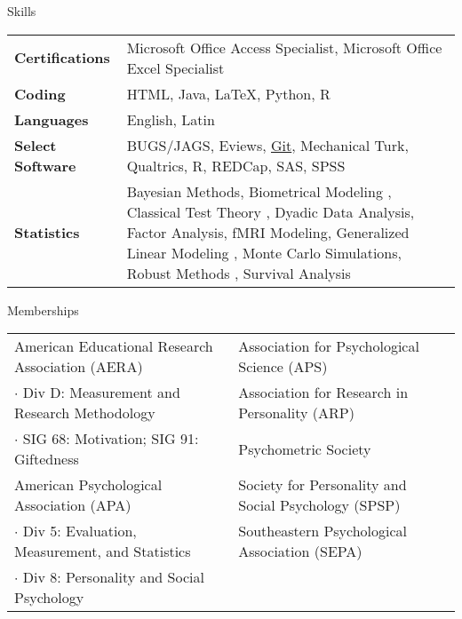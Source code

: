 \documentclass {resume}
\newcommand{\R}{\textup{\textrm{R}}\xspace}
\begin{document}
\begin{rSection}{\textrm{Skills}}
\begin{tabular}{ @{} >{\bfseries}l @{\hspace{6ex}} p{14cm} }

Certifications & Microsoft Office Access Specialist, Microsoft Office Excel Specialist\medskip\\
Coding & HTML, Java, \LaTeX, Python, \R \medskip\\
Languages & English, Latin\medskip\\
Select Software & %
BUGS/JAGS,
Eviews, %
\href{https://github.com/smasongarrison}{Git}, %
Mechanical Turk, %
Qualtrics, \R, REDCap, SAS, SPSS%
\medskip\\
Statistics & Bayesian Methods, Biometrical Modeling%
, Classical Test Theory%
, Dyadic Data Analysis, Factor Analysis, fMRI Modeling, Generalized Linear Modeling%
, Monte Carlo Simulations, Robust Methods%
, Survival Analysis %
\end{tabular}

\end{rSection}






\begin{samepage}\begin{rSection}{\textrm{Memberships}}
\begin{tabular}{ l l }
American Educational Research Association (AERA)& Association for Psychological Science (APS) \\
$\cdot$ {\small Div D: Measurement and Research Methodology} &  Association for Research in Personality (ARP)\\
$\cdot$ {\small SIG 68: Motivation; SIG 91: Giftedness}& Psychometric Society\\
American Psychological Association (APA) & Society for Personality and Social Psychology (SPSP)\\
$\cdot$ {\small Div 5: Evaluation, Measurement, and Statistics} &  Southeastern Psychological Association (SEPA)\\
$\cdot$ {\small Div 8: Personality and Social Psychology} \\
\end{tabular}
\end{rSection}\end{samepage}
\end{document}
